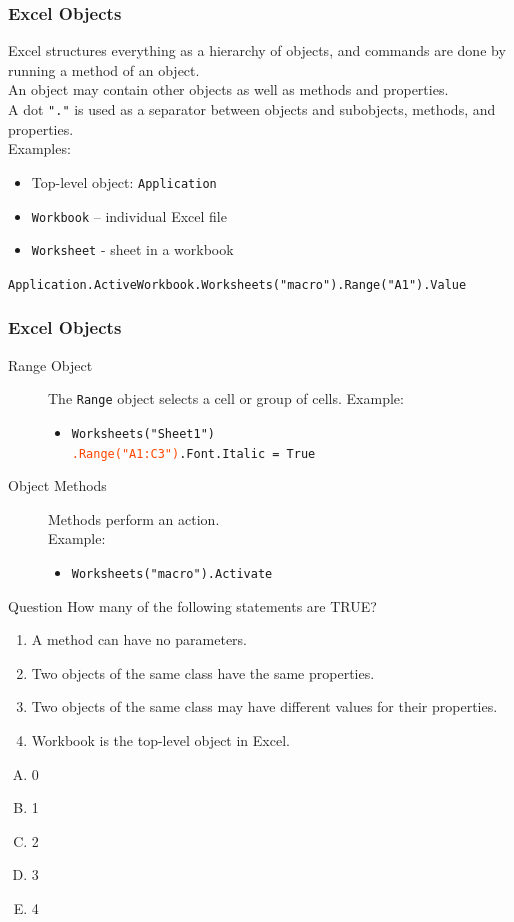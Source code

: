\documentclass[xcolor=svgnames,handout]{beamer}
\newcommand{\orange}[1]{\textcolor{OrangeRed}{#1}}
\newcommand{\ft}[1]{\frametitle{#1}}
\newcommand{\eol}{\\[1em]\pause}
\begin{document}
\begin{frame}[fragile]
\ft{Excel Objects}
Excel structures everything as a hierarchy of objects, and commands are done by running a method of an object.\eol
An object may contain other objects as well as methods and properties. \eol
A dot {\tt "."} is used as a separator between objects and subobjects, methods, and properties.\eol
Examples:
\begin{itemize}
 \item Top-level object: {\tt Application}
\item {\tt Workbook} -- individual Excel file
\item {\tt Worksheet} - sheet in a workbook
\end{itemize}

{\footnotesize \tt Application.ActiveWorkbook.Worksheets("macro").Range("A1").Value}
\end{frame}

\begin{frame}[fragile]
\ft{Excel Objects}
\begin{description}
\item[Range Object] The {\tt Range} object selects a cell or group of cells.
Example:
\begin{itemize}
\item {\tt Worksheets("Sheet1")}\\
 {\tt \orange{.Range("A1:C3")}.Font.Italic = True}\eol
\end{itemize}

\item[Object Methods] Methods perform an action.\\
Example:
\begin{itemize}
\item {\tt Worksheets("macro").Activate}
\end{itemize}
\end{description}
\end{frame}


\begin{frame}
\begin{exampleblock}{Question}
How many of the following statements are TRUE?
\begin{enumerate}
\item A method can have no parameters.
\item Two objects of the same class have the same properties.
\item Two objects of the same class may have different values for their properties.
\item Workbook is the top-level object in Excel.
\end{enumerate}
\begin{multicols}{5}
\begin{enumerate}[A)]
\item 0 
\item 1
\item 2
\item 3
\item 4
\end{enumerate}
\end{multicols}
\end{exampleblock}
\end{frame}
\end{document}
